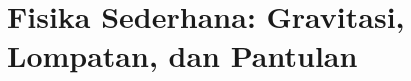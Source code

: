 \documentclass[../../main.tex]{subfiles}
\begin{document}
\chapter{Fisika Sederhana: Gravitasi, Lompatan, dan Pantulan}
\label{chap:fisika-sederhana}
























\ifSubfilesClassLoaded{%
  \clearpage
}{}
\end{document}
